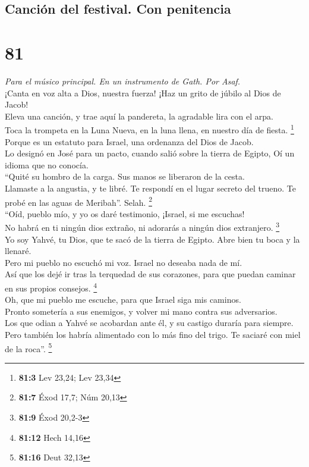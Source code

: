 \hypertarget{canciuxf3n-del-festival.-con-penitencia}{%
\subsection{Canción del festival. Con
penitencia}\label{canciuxf3n-del-festival.-con-penitencia}}

\hypertarget{section-78}{%
\section{81}\label{section-78}}

\emph{Para el músico principal. En un instrumento de Gath. Por Asaf.}\\
 ¡Canta en voz alta a Dios, nuestra fuerza! ¡Haz un grito
de júbilo al Dios de Jacob!\\
 Eleva una canción, y trae aquí la pandereta, la agradable
lira con el arpa.\\
 Toca la trompeta en la Luna Nueva, en la luna llena, en
nuestro día de fiesta. \footnote{\textbf{81:3} Lev 23,24; Lev 23,34}\\
 Porque es un estatuto para Israel, una ordenanza del Dios
de Jacob.\\
 Lo designó en José para un pacto, cuando salió sobre la
tierra de Egipto, Oí un idioma que no conocía.\\
 ``Quité su hombro de la carga. Sus manos se liberaron de
la cesta.\\
 Llamaste a la angustia, y te libré. Te respondí en el
lugar secreto del trueno. Te probé en las aguas de Meribah''. Selah.
\footnote{\textbf{81:7} Éxod 17,7; Núm 20,13}\\
 ``Oíd, pueblo mío, y yo os daré testimonio, ¡Israel, si
me escuchas!\\
 No habrá en ti ningún dios extraño, ni adorarás a ningún
dios extranjero. \footnote{\textbf{81:9} Éxod 20,2-3}\\
 Yo soy Yahvé, tu Dios, que te sacó de la tierra de
Egipto. Abre bien tu boca y la llenaré.\\
 Pero mi pueblo no escuchó mi voz. Israel no deseaba nada
de mí.\\
 Así que los dejé ir tras la terquedad de sus corazones,
para que puedan caminar en sus propios consejos. \footnote{\textbf{81:12}
  Hech 14,16}\\
 Oh, que mi pueblo me escuche, para que Israel siga mis
caminos.\\
 Pronto sometería a sus enemigos, y volver mi mano contra
sus adversarios.\\
 Los que odian a Yahvé se acobardan ante él, y su castigo
duraría para siempre.\\
 Pero también los habría alimentado con lo más fino del
trigo. Te saciaré con miel de la roca''. \footnote{\textbf{81:16} Deut
  32,13}

